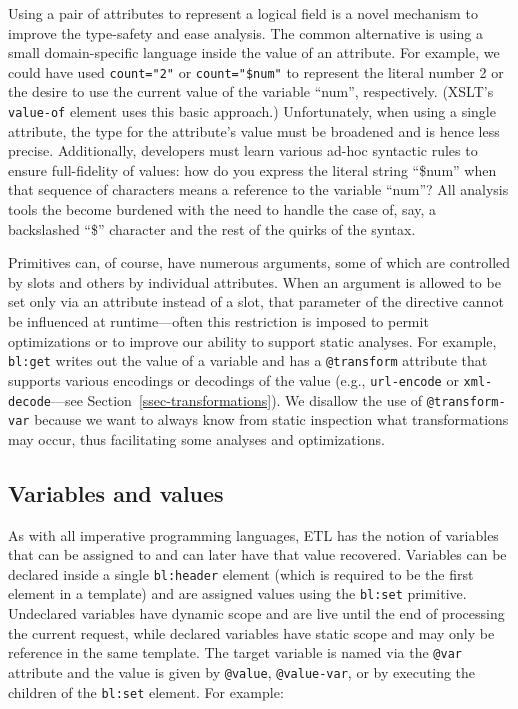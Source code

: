 \documentclass{www2003-submission}
\newcommand{\smtexttt}[1]{{\small\texttt{#1}}}
\newcommand{\ssecref}[1]{Section~\ref{ssec-#1}}
\begin{document}
Using a pair of attributes to represent a logical field is a novel
mechanism to improve the type-safety and ease analysis.  The common
alternative is using a small domain-specific language inside the value
of an attribute.  For example, we could have used \smtexttt{count="2"}
or \smtexttt{count="\$num"} to represent the literal number 2 or the
desire to use the current value of the variable ``num'', respectively.
(XSLT's \smtexttt{value-of} element uses this basic approach.)
Unfortunately, when using a single attribute, the type for the
attribute's value must be broadened and is hence less precise.
Additionally, developers must learn various ad-hoc syntactic rules to
ensure full-fidelity of values: how do you express the literal string
``\$num'' when that sequence of characters means a reference to the
variable ``num''?  All analysis tools the become burdened with the
need to handle the case of, say, a backslashed ``\$'' character and
the rest of the quirks of the syntax.

Primitives can, of course, have numerous arguments, some of which are
controlled by slots and others by individual attributes.  When an
argument is allowed to be set only via an attribute instead of a slot,
that parameter of the directive cannot be influenced at
runtime---often this restriction is imposed to permit optimizations or
to improve our ability to support static analyses.  For example,
\smtexttt{bl:get} writes out the value of a variable and has a
\smtexttt{@transform} attribute that supports various encodings or
decodings of the value (e.g., \smtexttt{url-encode} or
\smtexttt{xml-decode}---see \ssecref{transformations}).  We disallow the
use of \smtexttt{@transform-var} because we want to always know from
static inspection what transformations may occur, thus facilitating
some analyses and optimizations.

\subsection{Variables and values}
\label{ssec-variables}

As with all imperative programming languages, ETL has the notion of
variables that can be assigned to and can later have that value
recovered. Variables can be declared inside a single 
\smtexttt{bl:header} element (which is required to be the first element
in a template) and are assigned values using the
\smtexttt{bl:set} primitive. Undeclared variables have dynamic scope and
are live until the end of processing the current request, while
declared variables have static scope and may only be reference in
the same template.  The target variable is named via the
\smtexttt{@var} attribute and the value is given by
\smtexttt{@value}, \smtexttt{@value-var}, or by executing the
children of the \smtexttt{bl:set} element.  For example:
\end{document}
